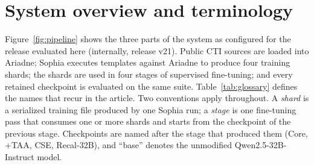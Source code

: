 \documentclass[twocolumn]{svjour3}
\begin{document}
\section{System overview and terminology}\label{sec:overview}
Figure~\ref{fig:pipeline} shows the three parts of the system as configured for the release evaluated here (internally, release v21). Public CTI sources are loaded into Ariadne; Sophia executes templates against Ariadne to produce four training shards; the shards are used in four stages of supervised fine-tuning; and every retained checkpoint is evaluated on the same suite. Table~\ref{tab:glossary} defines the names that recur in the article. Two conventions apply throughout. A \emph{shard} is a serialized training file produced by one Sophia run; a \emph{stage} is one fine-tuning pass that consumes one or more shards and starts from the checkpoint of the previous stage. Checkpoints are named after the stage that produced them (Core, +TAA, CSE, Recal-32B), and ``base'' denotes the unmodified Qwen2.5-32B-Instruct model.
\end{document}
